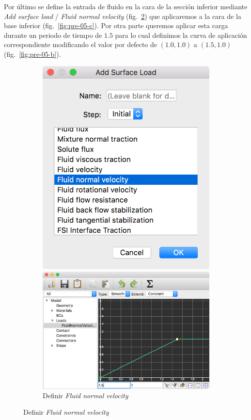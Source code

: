 Por último se define la entrada de fluido en la cara de la sección inferior mediante \emph{Add surface load} / \emph{Fluid normal velocity} (fig.~\ref{fig:pre-05-a}) que aplicaremos a la cara de la base inferior (fig.~\ref{fig:pre-05-c}).
Por otra parte queremos aplicar esta carga durante un periodo de tiempo de $1.5$ para lo cual definimos la curva de aplicación correspondiente modificando el valor por defecto de $(1.0, 1.0)$ a $(1.5, 1.0)$ (fig.~\ref{fig:pre-05-b}).
\begin{figure}[!ht]
\centering
\begin{subfigure}[b]{0.35\textwidth}
\centering
\includegraphics[width=0.6\linewidth]{figuras_4/05_pre_load-fnv-1.png}
\caption{Definir \emph{Fluid normal velocity}}
\label{fig:pre-05-a}
\includegraphics[width=\linewidth]{figuras_4/05_pre_load-fnv-3.png}

\end{subfigure}
\end{figure}
